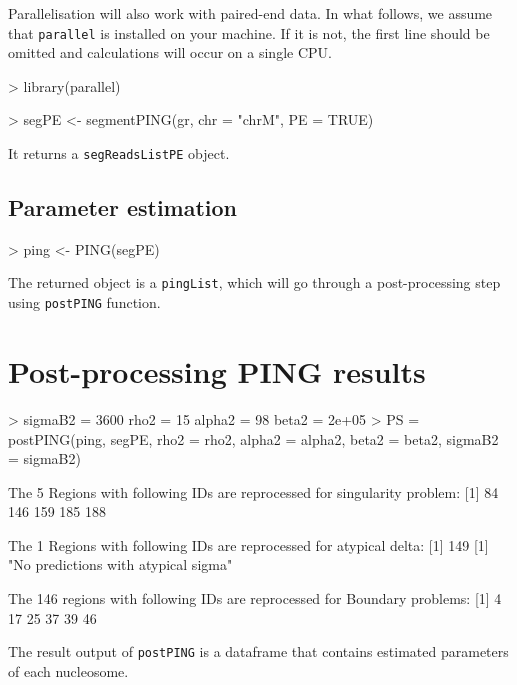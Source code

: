 \documentclass[11pt]{article}
\begin{document}
Parallelisation will also work with paired-end data. In what follows, we assume that \texttt{parallel} is installed on your machine. If it is not, the first line should be omitted and calculations will occur on a single CPU.

\begin{Schunk}
\begin{Sinput}
> library(parallel)
\end{Sinput}
\end{Schunk}


\begin{Schunk}
\begin{Sinput}
> segPE <- segmentPING(gr, chr = "chrM", PE = TRUE)
\end{Sinput}
\end{Schunk}

It returns a \texttt{segReadsListPE} object.


\subsection{Parameter estimation}

\begin{Schunk}
\begin{Sinput}
> ping <- PING(segPE)
\end{Sinput}
\end{Schunk}
The returned object is a \texttt{pingList}, which will go through a post-processing step using \texttt{postPING} function.


\section{Post-processing PING results}

\begin{Schunk}
\begin{Sinput}
> {
     sigmaB2 = 3600
     rho2 = 15
     alpha2 = 98
     beta2 = 2e+05
 }
> PS = postPING(ping, segPE, rho2 = rho2, alpha2 = alpha2, beta2 = beta2, 
     sigmaB2 = sigmaB2)
\end{Sinput}
\begin{Soutput}
 The 5 Regions with following IDs are reprocessed for singularity problem: 
[1]  84 146 159 185 188

 The 1 Regions with following IDs are reprocessed for atypical delta: 
[1] 149
[1] "No predictions with atypical sigma"

 The 146 regions with following IDs are reprocessed for Boundary problems: 
[1]  4 17 25 37 39 46
\end{Soutput}
\end{Schunk}
The result output of \texttt{postPING} is a dataframe that contains estimated parameters of each nucleosome.
\end{document}
